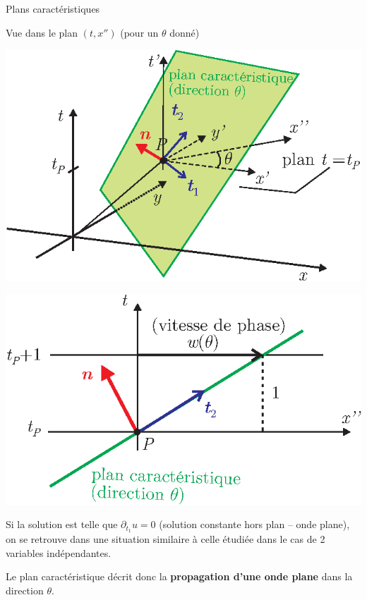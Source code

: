 \documentclass[
mode=present,    %
paper=a4paper,   %
orient=landscape,
display=slides,   %
size=10pt,
style=romain   %
]{powerdot}
\begin{document}
\begin{slide}[toc=]{Plans caractéristiques}

Vue dans le plan $(t,x'')$ (pour un $\theta$ donné)

\bigskip

\begin{minipage}[l]{0.4\textwidth}
    \centerline{\includegraphics[width=\textwidth]{plancarac.eps} }
\end{minipage}
\begin{minipage}[l]{0.6\textwidth-1cm}
    \centerline{\includegraphics[width=\textwidth]{plancarac2.eps} }
\end{minipage}

\bigskip

Si la solution est telle que $\partial_{t_1} u=0$ (solution constante hors plan -- onde plane), on se retrouve dans une situation similaire à celle étudiée dans le cas de 2 variables indépendantes.

\bigskip
Le plan caractéristique décrit donc la \textbf{propagation d'une onde plane} dans la direction $\theta$.


\end{slide}
\end{document}
